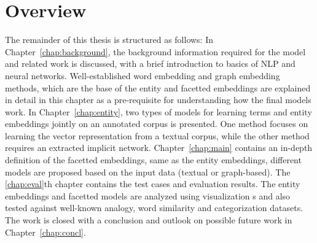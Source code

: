 \section{Overview}
The remainder of this thesis is structured as follows: In Chapter~\ref{chap:background}, the background information required for the model and related work is discussed, with a brief introduction to basics of NLP and neural networks. Well-established word embedding and graph embedding methods, which are the base of the entity and facetted embeddings are explained in detail in this chapter as a pre-requisite for understanding how the final models work. In Chapter~\ref{chap:entity}, two types of models for learning terms and entity embeddings jointly on an annotated corpus is presented. One method focuses on learning the vector representation from a textual corpus, while the other method requires an extracted implicit network. Chapter~\ref{chap:main} contains an in-depth definition of the facetted embeddings, same as the entity embeddings, different models are proposed based on the input data (textual or graph-based). The \ref{chap:eval}th chapter contains the test cases and evaluation results. The entity embeddings and facetted models are analyzed using visualization s and also tested against well-known analogy, word similarity and categorization datasets. The work is closed with a conclusion and outlook on possible future work in Chapter~\ref{chap:concl}. 
